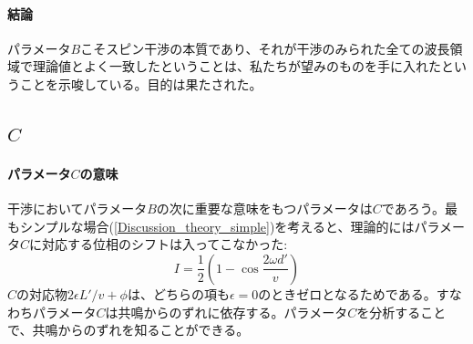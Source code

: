 \paragraph{結論}
パラメータ$B$こそスピン干渉の本質であり、それが干渉のみられた全ての波長領域で理論値とよく一致したということは、私たちが望みのものを手に入れたということを示唆している。目的は果たされた。

\subsection{$C$}
\paragraph{パラメータ$C$の意味}
干渉においてパラメータ$B$の次に重要な意味をもつパラメータは$C$であろう。最もシンプルな場合(\ref{Discussion_theory_simple})を考えると、理論的にはパラメータ$C$に対応する位相のシフトは入ってこなかった:
\begin{equation}
I=\frac{1}{2}\left(1-\cos\frac{2\omega d'}{v}\right)
\end{equation}
$C$の対応物$2\epsilon L'/v +\phi$は、どちらの項も$\epsilon=0$のときゼロとなるためである。すなわちパラメータ$C$は共鳴からのずれに依存する。パラメータ$C$を分析することで、共鳴からのずれを知ることができる。

